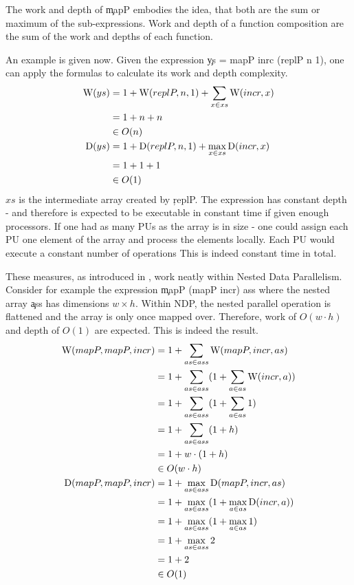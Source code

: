  The work and depth of \c{mapP} embodies the idea,
  that both are the sum or maximum of the sub-expressions.
  Work and depth of a function composition are the sum of the
  work and depths of each function.
  
  An example is given now. Given the expression
  \c{ys = mapP inrc (replP n 1)}, one can apply
  the formulas to calculate its work and depth complexity.
  \begin{equation*}
  \begin{split}
  \textrm{W}(ys)
        & = 1 + \textrm{W}(replP,n,1) + \sum_{x \in xs}\textrm{W}(incr,x) \\
        & = 1 + n + n \\
        & \in O(n) \\
  \textrm{D}(ys) & = 1 + \textrm{D}(replP,n,1) + \max_{x \in xs}\textrm{D}(incr,x) \\
      & = 1 + 1 + 1 \\
      & \in O(1) \\
  \end{split}
  \end{equation*}
  $xs$ is the intermediate array created by \c{replP}.
  The expression has constant depth - and therefore
  is expected to be executable in constant time if given enough processors.
  If one had as many PUs as the array is in size
  - one could assign each PU one element of the array and process
  the elements locally. Each PU would execute a constant number of operations
  This is indeed constant time in total.
  
  These measures, as introduced in \cite{Belloch1996}, work
  neatly within Nested Data Parallelism. Consider for example the
  expression \c{mapP (mapP incr) ass} where the
  nested array \c{ass} has dimensions $w \times h$.
  Within NDP, the nested parallel operation is
  flattened and the array is only once mapped over.
  Therefore, work of $O(w \cdot h)$ and depth of $O(1)$ are expected.
  This is indeed the result.
  \begin{equation*}
  \begin{split}
  \textrm{W}(mapP,mapP,incr)
        & = 1 + \sum_{as \in ass}\textrm{W}(mapP,incr,as) \\
        & = 1 + \sum_{as \in ass}(1 + \sum_{a \in as} \textrm{W}(incr,a)) \\
        & = 1 + \sum_{as \in ass}(1 + \sum_{a \in as} 1) \\
        & = 1 + \sum_{as \in ass}(1 + h) \\
        & = 1 + w \cdot (1 + h) \\
        & \in O(w \cdot h) \\
  \textrm{D}(mapP,mapP,incr) & = 1 + \max_{as \in ass}\textrm{D}(mapP,incr,as) \\
        & = 1 + \max_{as \in ass}(1 + \max_{a \in as} \textrm{D}(incr,a)) \\
        & = 1 + \max_{as \in ass}(1 + \max_{a \in as} 1) \\
        & = 1 + \max_{as \in ass}2 \\
        & = 1 + 2 \\
        & \in O(1) \\
  \end{split}
  \end{equation*}
  
